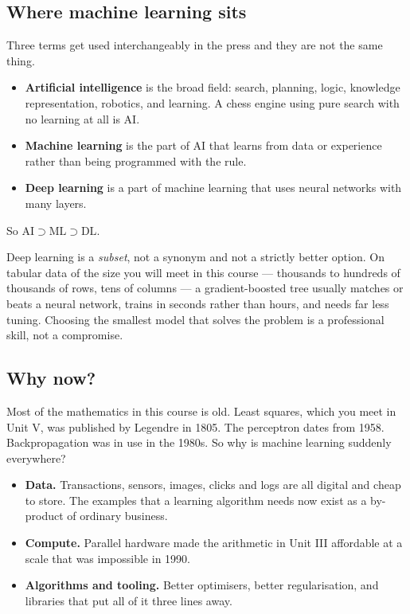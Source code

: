 \documentclass[11pt]{article}
\begin{document}
\subsection{Where machine learning sits}

Three terms get used interchangeably in the press and they are not the same
thing.

\begin{itemize}[leftmargin=*]
  \item \textbf{Artificial intelligence} is the broad field: search, planning,
    logic, knowledge representation, robotics, and learning. A chess engine
    using pure search with no learning at all is AI.
  \item \textbf{Machine learning} is the part of AI that learns from data or
    experience rather than being programmed with the rule.
  \item \textbf{Deep learning} is a part of machine learning that uses neural
    networks with many layers.
\end{itemize}

So $\text{AI} \supset \text{ML} \supset \text{DL}$.

\begin{caution}
Deep learning is a \emph{subset}, not a synonym and not a strictly better
option. On tabular data of the size you will meet in this course --- thousands
to hundreds of thousands of rows, tens of columns --- a gradient-boosted tree
usually matches or beats a neural network, trains in seconds rather than hours,
and needs far less tuning. Choosing the smallest model that solves the problem
is a professional skill, not a compromise.
\end{caution}

\subsection{Why now?}

Most of the mathematics in this course is old. Least squares, which you meet in
Unit V, was published by Legendre in 1805. The perceptron dates from 1958.
Backpropagation was in use in the 1980s. So why is machine learning suddenly
everywhere?

\begin{itemize}[leftmargin=*]
  \item \textbf{Data.} Transactions, sensors, images, clicks and logs are all
    digital and cheap to store. The examples that a learning algorithm needs now
    exist as a by-product of ordinary business.
  \item \textbf{Compute.} Parallel hardware made the arithmetic in Unit III
    affordable at a scale that was impossible in 1990.
  \item \textbf{Algorithms and tooling.} Better optimisers, better
    regularisation, and libraries that put all of it three lines away.
\end{itemize}
\end{document}
